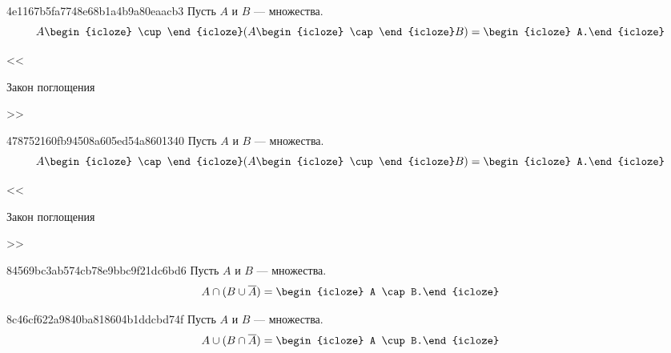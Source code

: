 \begin{note}{4e1167b5fa7748e68b1a4b9a80eaacb3}
    Пусть \({ A }\) и \({ B }\) --- множества.
    \[
        A \begin{icloze}{2}\cup\end{icloze} (A \begin{icloze}{3}\cap\end{icloze} B) = \begin{icloze}{1}A.\end{icloze}
    \]

    \begin{center}
        \tiny
        <<\begin{icloze}{4}Закон поглощения\end{icloze}>>
    \end{center}
\end{note}

\begin{note}{478752160fb94508a605ed54a8601340}
    Пусть \({ A }\) и \({ B }\) --- множества.
    \[
        A \begin{icloze}{2}\cap\end{icloze} (A \begin{icloze}{3}\cup\end{icloze} B) = \begin{icloze}{1}A.\end{icloze}
    \]

    \begin{center}
        \tiny
        <<\begin{icloze}{4}Закон поглощения\end{icloze}>>
    \end{center}
\end{note}

\begin{note}{84569bc3ab574cb78e9bbc9f21dc6bd6}
    Пусть \({ A }\) и \({ B }\) --- множества.
    \[
        A \cap (B \cup \overline{A}) = \begin{icloze}{1}A \cap B.\end{icloze}
    \]
\end{note}

\begin{note}{8c46cf622a9840ba818604b1ddcbd74f}
    Пусть \({ A }\) и \({ B }\) --- множества.
    \[
        A \cup (B \cap \overline{A}) = \begin{icloze}{1}A \cup B.\end{icloze}
    \]
\end{note}

